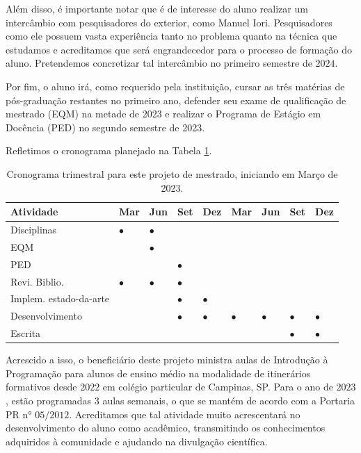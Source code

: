 \documentclass[11pt]{article}
\begin{document}
Além disso, é importante notar que é de interesse do aluno realizar um intercâmbio com pesquisadores do exterior, como Manuel Iori.
Pesquisadores como ele possuem vasta experiência tanto no problema quanto na técnica que estudamos e acreditamos que será engrandecedor para o processo de formação do aluno.
Pretendemos concretizar tal intercâmbio no primeiro semestre de \(2024\).

Por fim, o aluno irá, como requerido pela instituição, cursar as três matérias de pós-graduação restantes no primeiro ano, defender seu exame de qualificação de mestrado (EQM) na metade de 2023 e realizar o Programa de Estágio em Docência (PED) no segundo semestre de 2023.

Refletimos o cronograma planejado na Tabela \ref{tab:cron}.

\begin{table}[htbp]
\caption{\label{tab:cron}Cronograma trimestral para este projeto de mestrado, iniciando em Março de 2023.}
\centering
\begin{tabular}{lllllllll}
Atividade & Mar & Jun & Set & Dez & Mar & Jun & Set & Dez\\[0pt]
\hline
Disciplinas & \(\bullet\) & \(\bullet\) &  &  &  &  &  & \\[0pt]
EQM &  & \(\bullet\) &  &  &  &  &  & \\[0pt]
PED &  &  & \(\bullet\) &  &  &  &  & \\[0pt]
Revi. Biblio. & \(\bullet\) & \(\bullet\) & \(\bullet\) &  &  &  &  & \\[0pt]
Implem. estado-da-arte &  &  & \(\bullet\) & \(\bullet\) &  &  &  & \\[0pt]
Desenvolvimento &  &  & \(\bullet\) & \(\bullet\) & \(\bullet\) & \(\bullet\) & \(\bullet\) & \(\bullet\)\\[0pt]
Escrita &  &  &  &  &  &  & \(\bullet\) & \(\bullet\)\\[0pt]
\end{tabular}
\end{table}
Acrescido a isso, o beneficiário deste projeto ministra aulas de Introdução à Programação para alunos de ensino médio na modalidade de itinerários formativos desde \(2022\) em colégio particular de Campinas, SP.
Para o ano de \(2023\), estão programadas \(3\) aulas semanais, o que se mantém de acordo com a Portaria PR n° \(05/2012\).
Acreditamos que tal atividade muito acrescentará no desenvolvimento do aluno como acadêmico, transmitindo os conhecimentos adquiridos à comunidade e ajudando na divulgação científica.
\end{document}
